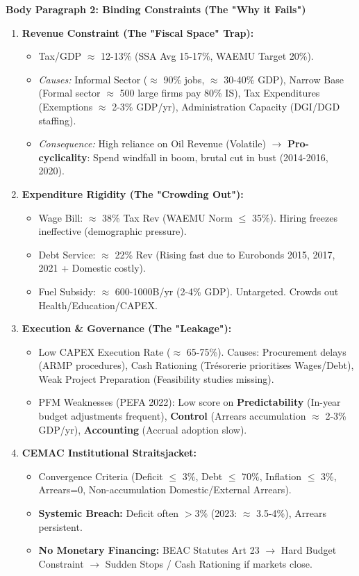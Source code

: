 \documentclass[11pt]{article}
\begin{document}
\begin{exoresolu}
\textbf{Body Paragraph 2: Binding Constraints (The "Why it Fails")} 
\begin{enumerate}
    \item \textbf{Revenue Constraint (The "Fiscal Space" Trap):} 
    \begin{itemize}
        \item Tax/GDP $\approx$ 12-13\% (SSA Avg 15-17\%, WAEMU Target 20\%). 
        \item \textit{Causes:} Informal Sector ($\approx$ 90\% jobs, $\approx$ 30-40\% GDP), Narrow Base (Formal sector $\approx$ 500 large firms pay 80\% IS), Tax Expenditures (Exemptions $\approx$ 2-3\% GDP/yr), Administration Capacity (DGI/DGD staffing).
        \item \textit{Consequence:} High reliance on Oil Revenue (Volatile) $\rightarrow$ \textbf{Pro-cyclicality}: Spend windfall in boom, brutal cut in bust (2014-2016, 2020).
    \end{itemize}
    \item \textbf{Expenditure Rigidity (The "Crowding Out"):} 
    \begin{itemize}
        \item Wage Bill: $\approx$ 38\% Tax Rev (WAEMU Norm $\le$ 35\%). Hiring freezes ineffective (demographic pressure).
        \item Debt Service: $\approx$ 22\% Rev (Rising fast due to Eurobonds 2015, 2017, 2021 + Domestic costly).
        \item Fuel Subsidy: $\approx$ 600-1000B/yr (2-4\% GDP). Untargeted. Crowds out Health/Education/CAPEX.
    \end{itemize}
    \item \textbf{Execution \& Governance (The "Leakage"):} 
    \begin{itemize}
        \item Low CAPEX Execution Rate ($\approx$ 65-75\%). Causes: Procurement delays (ARMP procedures), Cash Rationing (Trésorerie prioritises Wages/Debt), Weak Project Preparation (Feasibility studies missing).
        \item PFM Weaknesses (PEFA 2022): Low score on \textbf{Predictability} (In-year budget adjustments frequent), \textbf{Control} (Arrears accumulation $\approx$ 2-3\% GDP/yr), \textbf{Accounting} (Accrual adoption slow).
    \end{itemize}
    \item \textbf{CEMAC Institutional Straitsjacket:} 
    \begin{itemize}
        \item Convergence Criteria (Deficit $\le$ 3\%, Debt $\le$ 70\%, Inflation $\le$ 3\%, Arrears=0, Non-accumulation Domestic/External Arrears). 
        \item \textbf{Systemic Breach:} Deficit often $> 3\%$ (2023: $\approx$ 3.5-4\%), Arrears persistent. 
        \item \textbf{No Monetary Financing:} BEAC Statutes Art 23 $\rightarrow$ Hard Budget Constraint $\rightarrow$ Sudden Stops / Cash Rationing if markets close.
    \end{itemize}
\end{enumerate}


\end{exoresolu}
\end{document}
